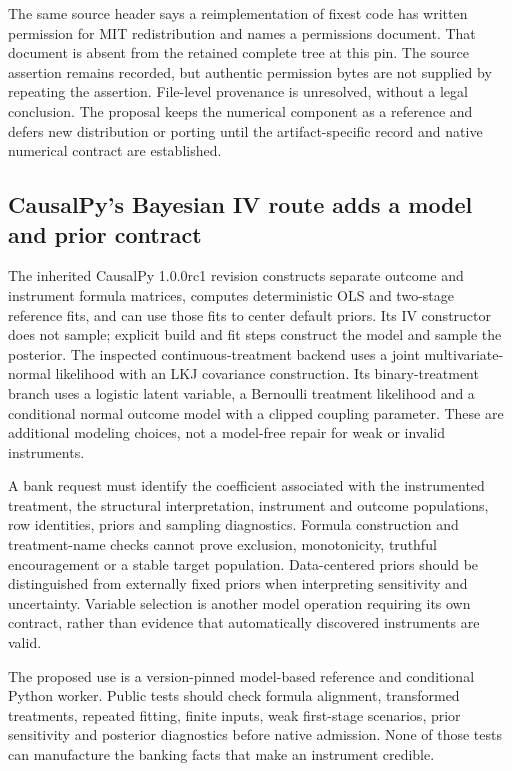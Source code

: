 The same source header says a reimplementation of fixest code has written
permission for MIT redistribution and names a permissions document. That
document is absent from the retained complete tree at this pin. The source
assertion remains recorded, but authentic permission bytes are not supplied
by repeating the assertion. File-level provenance is unresolved, without
a legal conclusion. The proposal keeps the numerical component as a
reference and defers new distribution or porting until the artifact-specific
record and native numerical contract are established.
\citep{exec25_pyrdiv_pyfixest,exec25_pyrdiv_choice}

\subsection{CausalPy's Bayesian IV route adds a model and prior contract}
The inherited CausalPy 1.0.0rc1 revision constructs separate outcome and
instrument formula matrices, computes deterministic OLS and two-stage
reference fits, and can use those fits to center default priors. Its IV
constructor does not sample; explicit build and fit steps construct the
model and sample the posterior. The inspected continuous-treatment backend
uses a joint multivariate-normal likelihood with an LKJ covariance
construction. Its binary-treatment branch uses a logistic latent variable,
a Bernoulli treatment likelihood and a conditional normal outcome model
with a clipped coupling parameter. These are additional modeling choices,
not a model-free repair for weak or invalid instruments.
\citep{exec25_pyrdiv_causalpy}

A bank request must identify the coefficient associated with the
instrumented treatment, the structural interpretation, instrument and
outcome populations, row identities, priors and sampling diagnostics.
Formula construction and treatment-name checks cannot prove exclusion,
monotonicity, truthful encouragement or a stable target population.
Data-centered priors should be distinguished from externally fixed priors
when interpreting sensitivity and uncertainty. Variable selection is
another model operation requiring its own contract, rather than evidence
that automatically discovered instruments are valid.
\citep{exec25_pyrdiv_causalpy,exec25_pyrdiv_choice}

The proposed use is a version-pinned model-based reference and conditional
Python worker. Public tests should check formula alignment, transformed
treatments, repeated fitting, finite inputs, weak first-stage scenarios,
prior sensitivity and posterior diagnostics before native admission.
None of those tests can manufacture the banking facts that make an
instrument credible.~\citep{exec25_pyrdiv_choice}

